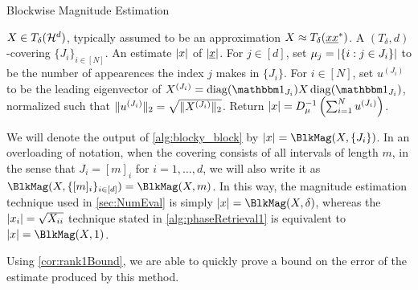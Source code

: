 \begin{algorithm}[htbp]
\renewcommand{\algorithmicrequire}{\textbf{Input:}}
\renewcommand{\algorithmicensure}{\textbf{Output:}}
\caption{Blockwise Magnitude Estimation}
\label{alg:blocky_block}
\begin{algorithmic}[1]
    \REQUIRE $X \in T_\delta(\mathcal{H}^d)$, typically assumed to be an approximation $X \approx T_\delta(\underline{x} \underline{x}^*)$.  A $(T_\delta, d)$-covering $\{J_i\}_{i \in [N]}$.
    \ENSURE An estimate $\lvert x\rvert$ of $\lvert\underline{x}\rvert$.
    \STATE For $j \in [d]$, set $\mu_j = \lvert\{i : j \in J_i\}\rvert$ to be the number of appearences the index $j$ makes in $\{J_i\}$.
    \STATE For $i \in [N]$, set $u^{(J_i)}$ to be the leading eigenvector of $X^{(J_i)} = \diag(\one_{J_i}) X \diag(\one_{J_i})$, normalized such that $\lVert u^{(J_i)}\rVert_2 = \sqrt{\lVert X^{(J_i)}\rVert_2}$.
    \STATE Return $\lvert x\rvert = D_\mu^{-1}\left(\sum_{i = 1}^N u^{(J_i)}\right)$.
    \end{algorithmic}
\end{algorithm}

We will denote the output of \cref{alg:blocky_block} by $\abs{x} = \BlkMag(X, \{J_i\})$.  In an overloading of notation, when the covering consists of all intervals of length $m$, in the sense that $J_i = [m]_i$ for $i = 1, \ldots, d$, we will also write it as $\BlkMag(X, \{[m]_i\}_{i \in [d]}) = \BlkMag(X, m)$.  In this way, the magnitude estimation technique used in \cref{sec:NumEval} is simply $\abs{x} = \BlkMag(X, \delta)$, whereas the $\lvert x_i\rvert = \sqrt{X_{ii}}$ technique stated in \cref{alg:phaseRetrieval1} is equivalent to $\abs{x} = \BlkMag(X, 1)$.

Using \cref{cor:rank1Bound}, we are able to quickly prove a bound on the error of the estimate produced by this method.

